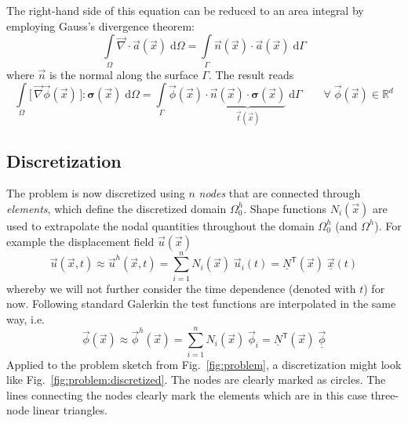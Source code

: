 \documentclass[times,namecite]{goose-article}
\begin{document}
The right-hand side of this equation can be reduced to an area integral by employing Gauss's divergence theorem:
\begin{equation}
  \int\limits_\Omega \vec{\nabla} \cdot \vec{a}(\vec{x}) \; \mathrm{d}\Omega
  =
  \int\limits_\Gamma \vec{n}(\vec{x}) \cdot \vec{a}(\vec{x}) \; \mathrm{d}\Gamma
\end{equation}
where $\vec{n}$ is the normal along the surface $\Gamma$. The result reads
\begin{equation}
\label{eq:static:weak:final}
  \int\limits_\Omega
    \big[\, \vec{\nabla} \vec{\phi}(\vec{x}) \,\big] : \bm{\sigma}(\vec{x}) \;
  \mathrm{d}\Omega
  =
  \int\limits_\Gamma
    \vec{\phi}(\vec{x}) \cdot
    \underbrace{
      \vec{n}(\vec{x}) \cdot \bm{\sigma}(\vec{x})
    }_{
      \vec{t}(\vec{x})
    } \;
  \mathrm{d}\Gamma
  \qquad
  \forall \; \vec{\phi}(\vec{x}) \in \mathbb{R}^d
\end{equation}

\subsection{Discretization}

The problem is now discretized using $n$ \emph{nodes} that are connected through \emph{elements}, which define the discretized domain $\Omega^h_0$. Shape functions $N_i(\vec{x})$ are used to extrapolate the nodal quantities throughout the domain $\Omega^h_0$ (and $\Omega^h$). For example the displacement field $\vec{u}(\vec{x})$
\begin{equation}
  \vec{u}(\vec{x},t)
  \approx
  \vec{u}^h(\vec{x},t)
  =
  \sum_{i=1}^{n} N_i (\vec{x}) \; \vec{u}_i (t)
  =
  \underline{N}^\mathsf{T} (\vec{x}) \; \underline{\vec{x}} (t)
\end{equation}
whereby we will not further consider the time dependence (denoted with $t$) for now. Following standard Galerkin the test functions are interpolated in the same way, i.e.\
\begin{equation}
\label{eq:discretization}
  \vec{\phi}(\vec{x})
  \approx
  \vec{\phi}^h(\vec{x})
  =
  \sum_{i=1}^{n} N_i (\vec{x}) \; \vec{\phi}_i
  =
  \underline{N}^\mathsf{T} (\vec{x}) \; \underline{\vec{\phi}}
\end{equation}
Applied to the problem sketch from Fig.~\ref{fig:problem}, a discretization might look like Fig.~\ref{fig:problem:discretized}. The nodes are clearly marked as circles. The lines connecting the nodes clearly mark the elements which are in this case three-node linear triangles.
\end{document}
